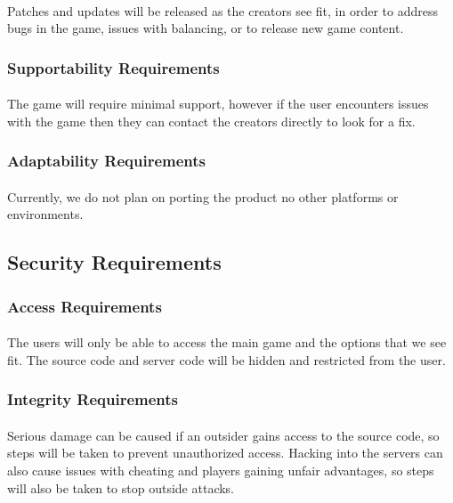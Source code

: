 \documentclass[12pt, titlepage]{article}
\begin{document}
\paragraph{}Patches and updates will be released as the creators see fit, in order to address bugs in the game, issues with balancing, or to release new game content. 
\subsubsection{Supportability Requirements}
\paragraph{}The game will require minimal support, however if the user encounters issues with the game then they can contact the creators directly to look for a fix. 
\subsubsection{Adaptability Requirements}
\paragraph{}Currently, we do not plan on porting the product no other platforms or environments.
\subsection{Security Requirements}
\subsubsection{Access Requirements}
\paragraph{}The users will only be able to access the main game and the options that we see fit. The source code and server code will be hidden and restricted from the user. 
\subsubsection{Integrity Requirements}
\paragraph{}Serious damage can be caused if an outsider gains access to the source code, so steps will be taken to prevent unauthorized access. Hacking into the servers can also cause issues with cheating and players gaining unfair advantages, so steps will also be taken to stop outside attacks. 
\end{document}
